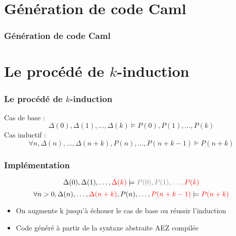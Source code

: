 \documentclass[18pt]{beamer}
\begin{document}
\section{Génération de code Caml}
\begin{frame}
\frametitle{Génération de code Caml}

\end{frame}	

\section{Le procédé de $k$-induction}
\begin{frame}
	\frametitle{Le procédé de $k$-induction}
	Cas de base :	$$\Delta(0), \Delta(1), \ldots, \Delta(k) \models  P(0), P(1), \ldots,  P(k)$$
	Cas inductif : $$\forall n, {\Delta(n), \ldots, \Delta(n+k), P(n), \ldots, P(n+k-1) \models P(n+k)}$$

\end{frame}	
\begin{frame}
	\frametitle{Implémentation}

		
			$$\Delta(0), \Delta(1), \ldots, \color{red} \Delta(k) \color{black} \models \color{gray} P(0), P(1), \ldots, \color{red} P(k)\color{black}$$
			$$\forall n>0, {\Delta(n), \ldots, \color{red} \Delta(n+k) \color{black}, P(n), \ldots, \color{red}P(n+k-1) \color{black} \models  \color{red}P(n+k)}\color{black}$$
	\begin{itemize}
		\item{On augmente k jusqu'à échouer le cas de base ou réussir l'induction}
		\item{Code généré à partir de la syntaxe abstraite AEZ compilée}
	\end{itemize}	
\end{frame}


\def\optimisation{Une optimisation : élimination de cas particuliers}
\end{document}
